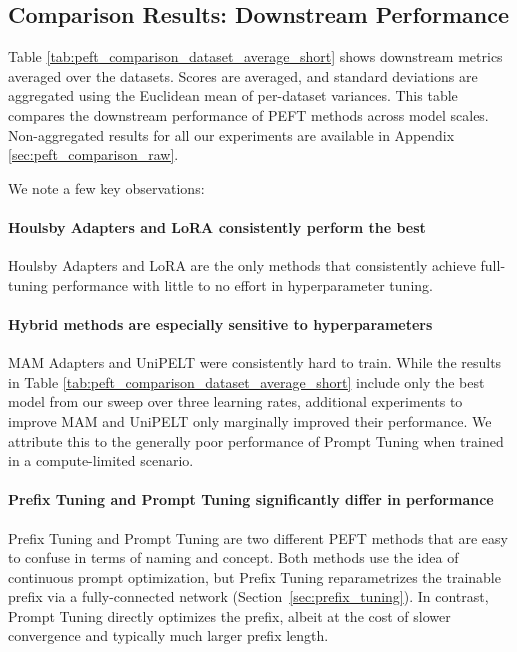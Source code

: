\subsection{Comparison Results: Downstream Performance}
\label{sec:peft_comparison_downstream}

Table \ref{tab:peft_comparison_dataset_average_short} shows downstream metrics averaged over the datasets. Scores are averaged, and standard deviations are aggregated using the Euclidean mean of per-dataset variances. This table compares the downstream performance of PEFT methods across model scales. Non-aggregated results for all our experiments are available in Appendix \ref{sec:peft_comparison_raw}.

We note a few key observations:

\paragraph{Houlsby Adapters and LoRA consistently perform the best}

Houlsby Adapters and LoRA are the only methods that consistently achieve full-tuning performance with little to no effort in hyperparameter tuning.

\paragraph{Hybrid methods are especially sensitive to hyperparameters}

MAM Adapters and UniPELT were consistently hard to train. While the results in Table \ref{tab:peft_comparison_dataset_average_short} include only the best model from our sweep over three learning rates, additional experiments to improve MAM and UniPELT only marginally improved their performance. We attribute this to the generally poor performance of Prompt Tuning when trained in a compute-limited scenario.

\paragraph{Prefix Tuning and Prompt Tuning significantly differ in performance}

Prefix Tuning \citep{prefix_tuning} and Prompt Tuning \citep{prompt_tuning} are two different PEFT methods that are easy to confuse in terms of naming and concept. Both methods use the idea of continuous prompt optimization, but Prefix Tuning reparametrizes the trainable prefix via a fully-connected network (Section~\ref{sec:prefix_tuning}). In contrast, Prompt Tuning directly optimizes the prefix, albeit at the cost of slower convergence and typically much larger prefix length.

